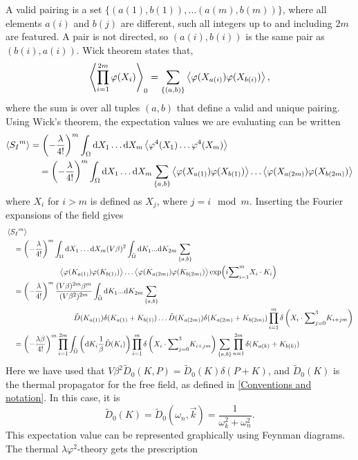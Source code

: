 A valid pairing is a set $\{(a(1), b(1)), \dots (a(m), b(m))\}$, where all elements $a(i)$ and $b(j)$ are different, such all integers up to and including $2m$ are featured.
A pair is not directed, so $(a(i), b(i))$ is the same pair as $(b(i), a(i))$.
Wick theorem states that,
\begin{equation}
    \ex{\prod_{i=1}^{2m} \varphi(X_i)  }_0
    = \sum_{\{(a, b)\}} \ex{\varphi(X_{a(i)}) \varphi(X_{b(i)})},
\end{equation}
where the sum is over all tuples $(a, b)$ that define a valid and unique pairing.
Using Wick's theorem, the expectation values we are evaluating can be written
\begin{align*}
    \ex{{S_I}^m} & 
    = \left(- \frac{\lambda }{4!}\right)^m 
    \int_{\Omega} \dd X_1 \dots \dd X_m
    \ex{\varphi^4(X_1) \dots \varphi^4(X_m)} \\ 
    & \quad
    = \left(- \frac{\lambda }{4!}\right)^m 
    \int_{\Omega} \dd X_1 \dots \dd X_m \sum_{\{a, b\}}
    \ex{\varphi(X_{a(1)}) \varphi(X_{b(1)})} 
    \dots
    \ex{\varphi(X_{a(2m)}) \varphi(X_{b(2m)})}
\end{align*}
where $X_i$ for $i>m$ is defined as $X_j$, where $j = i \mod m$.
Inserting the Fourier expansions of the field gives
\begin{align*}
    & \ex{{S_I}^m} \\ 
    &\quad 
    = \left(-\frac{\lambda }{4!}\right)^m 
    \int_{\Omega} \dd X_1 \dots \dd X_m
    (V \beta)^2 \int_{\tilde \Omega} \dd K_1 ... \dd K_{2m} \sum_{\{a, b\}} \\
    & \quad \quad \quad \quad\quad \quad \quad
    \ex{\varphi(K_{a(1)}) \varphi(K_{b(1)})} 
    \dots
    \ex{\varphi(K_{a(2m)}) \varphi(K_{b(2m)})}     
    \exp(i {\sum}_{i=1}^{m} X_i \cdot K_i)\\ 
    & \quad  
    = \left(-\frac{\lambda }{4!}\right)^m 
    \frac{(V \beta)^{2m} \beta^m}{(V \beta^2)^{2m}}
    \int_{\tilde \Omega} \dd K_1 ... \dd K_{2m} \sum_{\{a, b\}} \\
    & \quad \quad \quad \quad \quad \quad \quad \quad \quad
    \tilde D(K_{a(1)}) \delta(K_{a(1)} + K_{b(1)}) \dots 
    \tilde D(K_{a(2m)}) \delta(K_{a(2m)} + K_{b(2m)})
    \prod_{i=1}^m \delta\left(X_i \cdot {\sum}_{j=0}^3 K_{i + jm}\right) \\
    & \quad 
    = \left(-\frac{\lambda \beta}{4!}\right)^m 
    \prod_{i=1}^{2m} \int_{\tilde \Omega} 
    \left( \dd K_i \frac{1}{\beta} \tilde D(K_i)  \right) 
    \prod_{i=1}^m \delta\left(X_i \cdot {\sum}_{j=0}^3 K_{i + jm}\right)
    \sum_{\{a, b\}} 
    \prod_{n=1}^{2m}\delta(K_{a(k)} + K_{b(k)})
\end{align*}
Here we have used that $V \beta^2 \tilde D_0(K, P) = \tilde D_0(K) \delta(P + K)$, and $\tilde D_0(K)$ is the thermal propagator for the free field, as defined in \autoref{Conventions and notation}.
In this case, it is
\begin{equation}
    \tilde D_0(K) = \tilde D_0(\omega_n, \vec k) = \frac{1}{\omega_k^2 + \omega_n^2}.
\end{equation}
This expectation value can be represented graphically using Feynman diagrams.
The thermal $\lambda \varphi^2$-theory gets the prescription

